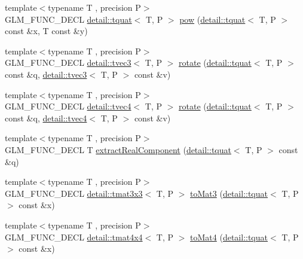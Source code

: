 \begin{DoxyCompactItemize}
{\footnotesize template$<$typename T , precision P$>$ }\\G\+L\+M\+\_\+\+F\+U\+N\+C\+\_\+\+D\+E\+CL \hyperlink{structglm_1_1detail_1_1tquat}{detail\+::tquat}$<$ T, P $>$ \hyperlink{group__gtx__quaternion_ga9c9854d641f71f853cfed9dc5d4ef762}{pow} (\hyperlink{structglm_1_1detail_1_1tquat}{detail\+::tquat}$<$ T, P $>$ const \&x, T const \&y)
\item 
{\footnotesize template$<$typename T , precision P$>$ }\\G\+L\+M\+\_\+\+F\+U\+N\+C\+\_\+\+D\+E\+CL \hyperlink{structglm_1_1detail_1_1tvec3}{detail\+::tvec3}$<$ T, P $>$ \hyperlink{group__gtx__quaternion_gaa4ac5806c1c001ac0247b1e1fd07dddf}{rotate} (\hyperlink{structglm_1_1detail_1_1tquat}{detail\+::tquat}$<$ T, P $>$ const \&q, \hyperlink{structglm_1_1detail_1_1tvec3}{detail\+::tvec3}$<$ T, P $>$ const \&v)
\item 
{\footnotesize template$<$typename T , precision P$>$ }\\G\+L\+M\+\_\+\+F\+U\+N\+C\+\_\+\+D\+E\+CL \hyperlink{structglm_1_1detail_1_1tvec4}{detail\+::tvec4}$<$ T, P $>$ \hyperlink{group__gtx__quaternion_ga3461e43b8c7da533b10bc5e9961add80}{rotate} (\hyperlink{structglm_1_1detail_1_1tquat}{detail\+::tquat}$<$ T, P $>$ const \&q, \hyperlink{structglm_1_1detail_1_1tvec4}{detail\+::tvec4}$<$ T, P $>$ const \&v)
\item 
{\footnotesize template$<$typename T , precision P$>$ }\\G\+L\+M\+\_\+\+F\+U\+N\+C\+\_\+\+D\+E\+CL T \hyperlink{group__gtx__quaternion_gaad86e595f0021253cb9d34ca32f27f3c}{extract\+Real\+Component} (\hyperlink{structglm_1_1detail_1_1tquat}{detail\+::tquat}$<$ T, P $>$ const \&q)
\item 
{\footnotesize template$<$typename T , precision P$>$ }\\G\+L\+M\+\_\+\+F\+U\+N\+C\+\_\+\+D\+E\+CL \hyperlink{structglm_1_1detail_1_1tmat3x3}{detail\+::tmat3x3}$<$ T, P $>$ \hyperlink{group__gtx__quaternion_ga9955d74e4bdcfec4039c5285c6e99d8f}{to\+Mat3} (\hyperlink{structglm_1_1detail_1_1tquat}{detail\+::tquat}$<$ T, P $>$ const \&x)
\item 
{\footnotesize template$<$typename T , precision P$>$ }\\G\+L\+M\+\_\+\+F\+U\+N\+C\+\_\+\+D\+E\+CL \hyperlink{structglm_1_1detail_1_1tmat4x4}{detail\+::tmat4x4}$<$ T, P $>$ \hyperlink{group__gtx__quaternion_ga5d441af6e45262436e73070269d8470c}{to\+Mat4} (\hyperlink{structglm_1_1detail_1_1tquat}{detail\+::tquat}$<$ T, P $>$ const \&x)
\item 

\end{DoxyCompactItemize}
